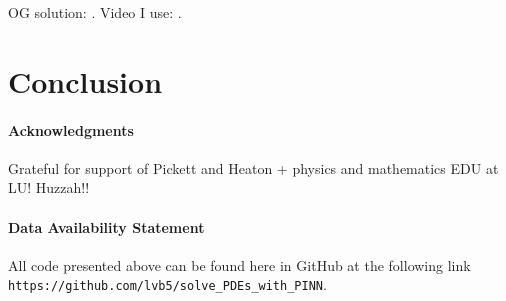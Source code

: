 \documentclass{CUP-JNL-DTM}%
\theoremstyle{definition}
\numberwithin{equation}{section}
\begin{document}
OG solution: \cite{schwarzschildGravitationalFieldMass1999}. Video I use: \cite{eigenchrisRelativity108aSchwarzschild}. 


\section{Conclusion}


\begin{Backmatter}

\paragraph{Acknowledgments}

Grateful for support of Pickett and Heaton + physics and mathematics EDU at LU! Huzzah!!

\paragraph{Data Availability Statement} All code presented above can be found here in GitHub at the following link \texttt{https://github.com/lvb5/solve\_PDEs\_with\_PINN}. 




\end{Backmatter}
\end{document}
